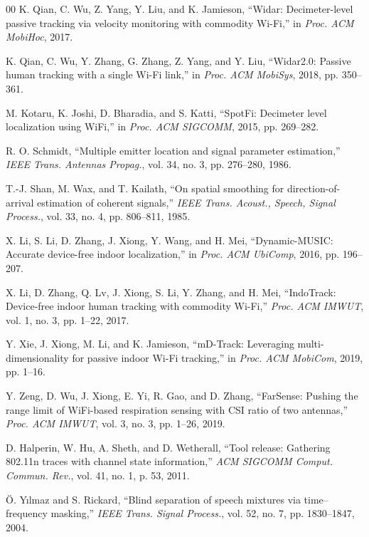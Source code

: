 \documentclass[conference]{IEEEtran}
\begin{document}
\begin{thebibliography}{00}
 K. Qian, C. Wu, Z. Yang, Y. Liu, and K. Jamieson,
``Widar: Decimeter-level passive tracking via velocity monitoring with
commodity Wi-Fi,'' in \emph{Proc. ACM MobiHoc}, 2017.

 K. Qian, C. Wu, Y. Zhang, G. Zhang, Z. Yang, and
Y. Liu, ``Widar2.0: Passive human tracking with a single Wi-Fi link,'' in
\emph{Proc. ACM MobiSys}, 2018, pp. 350--361.

 M. Kotaru, K. Joshi, D. Bharadia, and S. Katti,
``SpotFi: Decimeter level localization using WiFi,'' in \emph{Proc. ACM
SIGCOMM}, 2015, pp. 269--282.

 R. O. Schmidt, ``Multiple emitter location and
signal parameter estimation,'' \emph{IEEE Trans. Antennas Propag.}, vol. 34,
no. 3, pp. 276--280, 1986.

 T.-J. Shan, M. Wax, and T. Kailath, ``On spatial
smoothing for direction-of-arrival estimation of coherent signals,''
\emph{IEEE Trans. Acoust., Speech, Signal Process.}, vol. 33, no. 4,
pp. 806--811, 1985.

 X. Li, S. Li, D. Zhang, J. Xiong, Y. Wang, and
H. Mei, ``Dynamic-MUSIC: Accurate device-free indoor localization,'' in
\emph{Proc. ACM UbiComp}, 2016, pp. 196--207.

 X. Li, D. Zhang, Q. Lv, J. Xiong, S. Li, Y. Zhang,
and H. Mei, ``IndoTrack: Device-free indoor human tracking with commodity
Wi-Fi,'' \emph{Proc. ACM IMWUT}, vol. 1, no. 3, pp. 1--22, 2017.

 Y. Xie, J. Xiong, M. Li, and K. Jamieson,
``mD-Track: Leveraging multi-dimensionality for passive indoor Wi-Fi
tracking,'' in \emph{Proc. ACM MobiCom}, 2019, pp. 1--16.

 Y. Zeng, D. Wu, J. Xiong, E. Yi, R. Gao, and
D. Zhang, ``FarSense: Pushing the range limit of WiFi-based respiration
sensing with CSI ratio of two antennas,'' \emph{Proc. ACM IMWUT}, vol. 3,
no. 3, pp. 1--26, 2019.

 D. Halperin, W. Hu, A. Sheth, and D. Wetherall,
``Tool release: Gathering 802.11n traces with channel state information,''
\emph{ACM SIGCOMM Comput. Commun. Rev.}, vol. 41, no. 1, p. 53, 2011.

 \"O. Y{\i}lmaz and S. Rickard, ``Blind separation of
speech mixtures via time--frequency masking,'' \emph{IEEE Trans. Signal
Process.}, vol. 52, no. 7, pp. 1830--1847, 2004.


\end{thebibliography}
\end{document}
